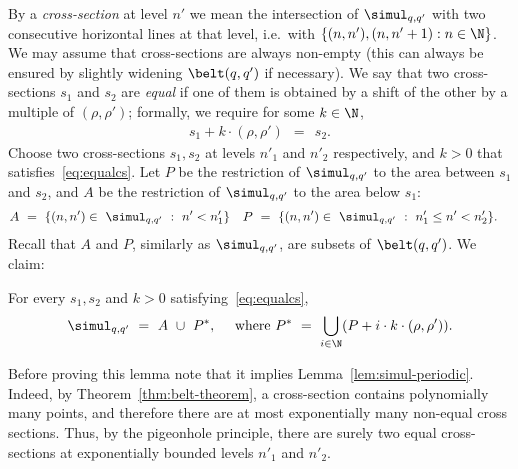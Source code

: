 By a \emph{cross-section} at level $n'$ we mean the intersection of $\simul_{q,q'}$
with two consecutive horizontal lines at that level,
i.e.~with $\{ (n,n'), (n,n'+1) : n \in \N \}$.
We may assume that cross-sections are always non-empty (this can always be ensured by
slightly widening $\belt(q,q')$ if necessary).
We say that two cross-sections $s_1$ and $s_2$ are \emph{equal} if
one of them is obtained by a shift of the other by a multiple of $(\rho, \rho')$; formally, we require 
for some $k \in \N$,
\begin{align} \label{eq:equalcs}
s_1 + k \cdot (\rho, \rho') \  \ = \ \ s_2.
\end{align}
Choose two cross-sections $s_1, s_2$ at levels $n'_1$ and $n'_2$ respectively,
and $k > 0$ that satisfies~\eqref{eq:equalcs}.
Let $P$ be the restriction of $\simul_{q,q'}$ to the area between $s_1$ and $s_2$, 
and $A$ be the restriction of $\simul_{q,q'}$ to the area below $s_1$:
\begin{align*}
A \ & = \  \{ (n,n') \in \  \simul_{q,q'} \ : \ n' < n'_1 \} &
P \ & = \ \{ (n,n') \in \ \simul_{q,q'} \ : \ n'_1 \leq n' < n'_2 \}.
\end{align*}
Recall that $A$ and $P$, similarly as $\simul_{q,q'}$, are subsets of $\belt(q,q')$. We claim: 
\begin{lemma} \label{lem:periodicbelt}
For every $s_1, s_2$ and $k > 0$ satisfying~\eqref{eq:equalcs},
\[
\simul_{q,q'} \ = \ A \ \cup \ P^*, \quad \text{ where } P^* \ = \ \bigcup_{i \in \N} (P + i \cdot k \cdot (\rho,\rho')).
\]
\end{lemma}
Before proving this lemma note that it implies Lemma~\ref{lem:simul-periodic}.
Indeed, by Theorem~\ref{thm:belt-theorem}, a cross-section contains polynomially many points, and therefore there are at most exponentially many non-equal
cross sections.
Thus, by the pigeonhole principle, there are surely two equal cross-sections
at exponentially bounded levels $n'_1$ and $n'_2$.
 


